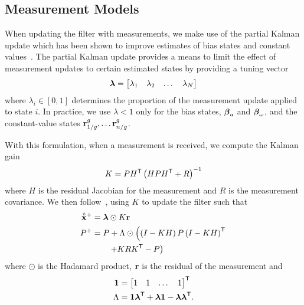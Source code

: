
\subsection{Measurement Models}
\label{sec:measurement_models}

When
updating the filter with measurements, we make use of the partial Kalman update
which has been shown to improve estimates of bias states and constant values~\cite{brink2017partial}. The partial Kalman update provides a
means to limit the effect of measurement updates to certain estimated
states by providing a tuning vector
\begin{equation}
  \boldsymbol{\mathrm{\lambda}} =
\begin{bmatrix}
  \lambda_1 & \lambda_2 & \dots & \lambda_N
\end{bmatrix}
\end{equation}
where $\lambda_i \in \left[ 0, 1\right]$ determines the proportion of the
measurement update applied to state $i$.
In practice, we use $\lambda < 1$ only for the
bias states, $\boldsymbol{\mathrm{\beta}}_a$ and $\boldsymbol{\mathrm{\beta}}_\omega$, and the
constant-value states $\vect{r}_{1/g}^{g}, \dots \vect{r}_{n/g}^{g}$.

With this formulation,
when a measurement is received, we compute the Kalman gain
\begin{equation}
  K = P H^{\mathsf{T}} \left(H P H^{\mathsf{T}} + R \right)^{-1}
\end{equation}
where $H$ is the residual Jacobian for the measurement and $R$ is the
measurement covariance. We then follow~\cite{brink2017partial}, using $K$ to update the filter such that
\begin{align}
  \hat{\tilde{\boldsymbol{\mathrm{x}}}}^{+} &= \boldsymbol{\mathrm{\lambda}} \odot K \boldsymbol{\mathrm{r}} \\
  P^{+} &= P + \Lambda \odot \left( \left(I - K H \right) P \left(I - K H
  \right)^{\mathsf{T}} \right. \\
  & \qquad \left. + K R K^{\mathsf{T}} - P \right) \nonumber
\end{align}
where $\odot$ is the Hadamard product, $\boldsymbol{\mathrm{r}}$ is the residual of the
measurement and
\begin{align}
  \boldsymbol{\mathrm{1}} &= \begin{bmatrix} 1 & 1 & \dots & 1 \end{bmatrix}^{\mathsf{T}} \\
  \Lambda &= \boldsymbol{\mathrm{1}} \boldsymbol{\mathrm{\lambda}}^{\mathsf{T}} + \boldsymbol{\mathrm{\lambda}} \boldsymbol{\mathrm{1}} -
  \boldsymbol{\mathrm{\lambda}} \boldsymbol{\mathrm{\lambda}}^{\mathsf{T}}.
\end{align}

